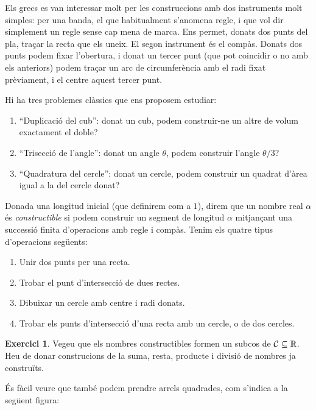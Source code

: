\documentclass[
]{book}
\providecommand{\tightlist}{%
  \setlength{\itemsep}{0pt}\setlength{\parskip}{0pt}}
\theoremstyle{definition}
\theoremstyle{definition}
\theoremstyle{definition}
\newtheorem{exercise}{Exercici}[chapter]
\theoremstyle{definition}
\theoremstyle{remark}
\begin{document}
Els grecs es van interessar molt per les construccions amb dos instruments molt simples: per una banda, el que habitualment
s'anomena regle, i que vol dir simplement un regle sense cap mena de marca. Ens permet, donats dos punts del pla, traçar la recta
que els uneix. El segon instrument és el compàs. Donats dos punts podem fixar l'obertura, i donat un tercer punt (que pot coincidir
o no amb els anteriors) podem traçar un arc de circumferència amb el radi fixat prèviament, i el centre aquest tercer punt.

Hi ha tres problemes clàssics que ens proposem estudiar:

\begin{enumerate}
\def\labelenumi{\arabic{enumi}.}
\tightlist
\item
  ``Duplicació del cub'': donat un cub, podem construir-ne un altre de volum exactament el doble?
\item
  ``Trisecció de l'angle'': donat un angle \(\theta\), podem construir l'angle \(\theta/3\)?
\item
  ``Quadratura del cercle'': donat un cercle, podem construir un quadrat d'àrea igual a la del cercle donat?
\end{enumerate}

Donada una longitud inicial (que definirem com a \(1\)), direm que un nombre real \(\alpha\) és \emph{constructible} si
podem construir un segment de longitud \(\alpha\) mitjançant una successió finita d'operacions amb regle i compàs. Tenim els quatre
tipus d'operacions següents:

\begin{enumerate}
\def\labelenumi{\arabic{enumi}.}
\tightlist
\item
  Unir dos punts per una recta.
\item
  Trobar el punt d'intersecció de dues rectes.
\item
  Dibuixar un cercle amb centre i radi donats.
\item
  Trobar els punts d'intersecció d'una recta amb un cercle, o de dos cercles.
\end{enumerate}

\begin{exercise}
Vegeu que els nombres constructibles formen un subcos de \(\mathcal{C}\subseteq\mathbb{R}\). Heu de donar construcions de la suma, resta, producte i divisió
de nombres ja construïts.
\end{exercise}

És fàcil veure que també podem prendre arrels quadrades, com s'indica a la següent figura:
\end{document}

